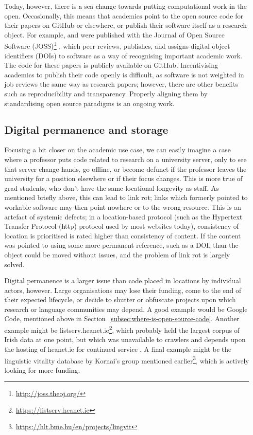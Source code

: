 Today, however, there is a sea change towards putting computational work in the open. Occasionally, this means that academics point to the open source code for their papers on GitHub or elsewhere, or publish their software itself as a research object. For example, \citet{makela2016integrated} and \citet{kleinberg2017web} were published with the Journal of Open Source Software (JOSS)\footnote{\href{http://joss.theoj.org/}{http://joss.theoj.org/}} \citep{smith2018journal}, which peer-reviews, publishes, and assigns digital object identifiers (DOIs) to software as a way of recognising important academic work. The code for these papers is publicly available on GitHub. Incentivising academics to publish their code openly is difficult, as software is not weighted in job reviews the same way as research papers; however, there are other benefits such as reproducibility and transparency. Properly aligning them by standardising open source paradigms is an ongoing work.

\subsection{Digital permanence and storage}
\label{subsec:digital-permanence}

Focusing a bit closer on the academic use case, we can easily imagine a case where a professor puts code related to research on a university server, only to see that server change hands, go offline, or become defunct if the professor leaves the university for a position elsewhere or if their focus changes. This is more true of grad students, who don't have the same locational longevity as staff. As mentioned briefly above, this can lead to link rot; links which formerly pointed to workable software may then point nowhere or to the wrong resource. This is an artefact of systemic defects; in a location-based protocol (such as the Hypertext Transfer Protocol (http) protocol used by most websites today), consistency of location is prioritised is rated higher than consistency of content. If the content was pointed to using some more permanent reference, such as a DOI, than the object could be moved without issues, and the problem of link rot is largely solved.

Digital permanence is a larger issue than code placed in locations by individual actors, however. Large organisations may lose their funding, come to the end of their expected lifecycle, or decide to shutter or obfuscate projects upon which research or language communities may depend. A good example would be Google Code, mentioned above in Section~\ref{subsec:where-is-open-source-code}. Another example might be listserv.heanet.ie\footnote{\href{https://listserv.heanet.ie}{https://listserv.heanet.ie}}, which probably held the largest corpus of Irish data at one point, but which was unavailable to crawlers and depends upon the hosting of heanet.ie for continued service \citep{scannell2007crubadan}. A final example might be the linguistic vitality database by Kornai's group mentioned earlier\footnote{\href{https://hlt.bme.hu/en/projects/lingvit}{https://hlt.bme.hu/en/projects/lingvit}}, which is actively looking for more funding.

